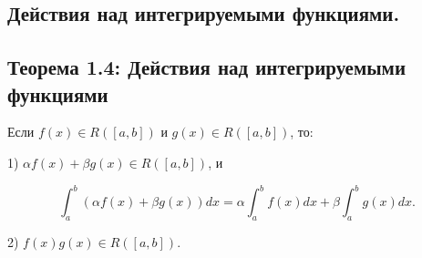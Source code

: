 {
\subsection{Действия над интегрируемыми функциями. }
\subsection*{Теорема 1.4: Действия над интегрируемыми функциями}

Если \( f(x) \in R([a, b]) \) и \( g(x) \in R([a, b]) \), то:

1) \( \alpha f(x) + \beta g(x) \in R([a, b]) \), и


\[
\int_{a}^{b} (\alpha f(x) + \beta g(x)) dx = \alpha \int_{a}^{b} f(x) dx + \beta \int_{a}^{b} g(x) dx.
\]



2) \( f(x) g(x) \in R([a, b]) \).

}
